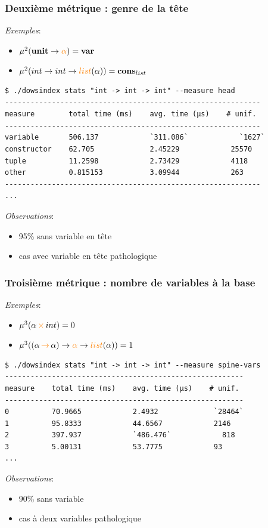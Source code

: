 \documentclass[serif]{beamer}
\newcommand{\exemples}{\textit{Exemples}\xspace}
\newcommand{\observations}{\textit{Observations}\xspace}
\newcommand{\unit}{\bold{unit}}
\begin{document}
\begin{frame}[fragile=singleslide]\frametitle{Deuxième métrique : genre de la tête}
\scriptsize
\exemples :
\begin{itemize}
	\item $\mu^2 (\unit \rightarrow \textcolor{orange}{\alpha}) = \bold{var}$
	\item $\mu^2 (int \rightarrow int \rightarrow \textcolor{orange}{list} (\alpha)) = \bold{cons}_{list}$
\end{itemize}
\bigskip
\begin{lstlisting}
$ ./dowsindex stats "int -> int -> int" --measure head
------------------------------------------------------------
measure        total time (ms)    avg. time (µs)    # unif.
------------------------------------------------------------
variable       506.137            `311.086`            `1627`
constructor    62.705             2.45229            25570
tuple          11.2598            2.73429            4118
other          0.815153           3.09944            263
------------------------------------------------------------
...
\end{lstlisting}
\observations :
\begin{itemize}
	\item 95\% sans variable en tête
	\item cas avec variable en tête pathologique
\end{itemize}
\end{frame}


\begin{frame}[fragile=singleslide]\frametitle{Troisième métrique : nombre de variables à la base}
\scriptsize
\exemples :
\begin{itemize}
	\item $\mu^3 (\alpha \,\textcolor{orange}{\times}\, int) = 0$
	\item $\mu^3 ((\alpha \,\textcolor{orange}{\rightarrow}\, \alpha) \rightarrow \textcolor{orange}{\alpha} \rightarrow \textcolor{orange}{list} (\alpha)) = 1$
\end{itemize}
\bigskip
\begin{lstlisting}
$ ./dowsindex stats "int -> int -> int" --measure spine-vars
--------------------------------------------------------
measure    total time (ms)    avg. time (µs)    # unif.
--------------------------------------------------------
0          70.9665            2.4932             `28464`
1          95.8333            44.6567            2146
2          397.937            `486.476`            818
3          5.00131            53.7775            93
...
\end{lstlisting}
\observations :
\begin{itemize}
	\item 90\% sans variable
	\item cas à deux variables pathologique
\end{itemize}
\end{frame}
\end{document}
